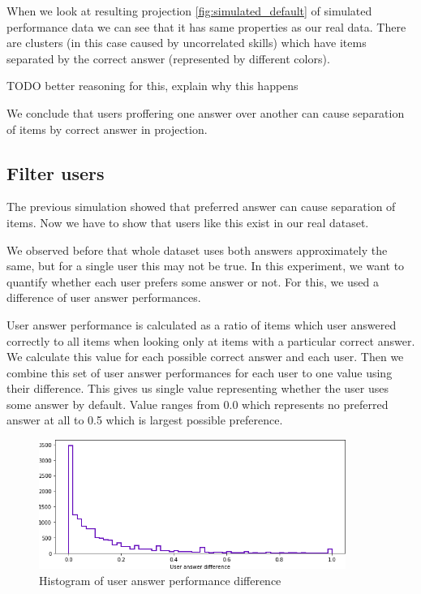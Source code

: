 \documentclass[
  digital, %
  table,   %
  nolof,     %
  nolot,     %
  nocover,
  color,
  final, %
]{fithesis3}
\begin{document}
When we look at resulting projection \ref{fig:simulated_default} of simulated performance data we can see that it has same properties as our real data. There are clusters (in this case caused by uncorrelated skills) which have items separated by the correct answer (represented by different colors).

TODO better reasoning for this, explain why this happens

We conclude that users proffering one answer over another can cause separation of items by correct answer in projection.


\subsection{Filter users}\label{filter-users}


The previous simulation showed that preferred answer can cause separation of items. Now we have to show that users like this exist in our real dataset.

We observed before that whole dataset uses both answers approximately the same, but for a single user this may not be true. In this experiment, we want to quantify whether each user prefers some answer or not. For this, we used a difference of user answer performances.

User answer performance is calculated as a ratio of items which user answered correctly to all items when looking only at items with a particular correct answer. We calculate this value for each possible correct answer and each user. Then we combine this set of user answer performances for each user to one value using their difference. This gives us single value representing whether the user uses some answer by default. Value ranges from 0.0 which represents no preferred answer at all to 0.5 which is largest possible preference.

\begin{figure}
  \includegraphics[width=10cm]{img/uneven_answers_hist}
  \caption{Histogram of user answer performance difference}
  \label{fig:uneven_answers_hist}
\end{figure}
\end{document}
